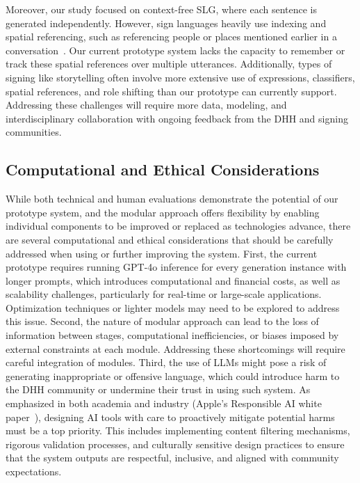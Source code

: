 Moreover, our study focused on context-free SLG, where each sentence is generated independently. However, sign languages heavily use indexing and spatial referencing, such as referencing people or places mentioned earlier in a conversation~\cite{winston1991spatial,friedman1975space}. Our current prototype system lacks the capacity to remember or track these spatial references over multiple utterances. Additionally, types of signing like storytelling often involve more extensive use of expressions, classifiers, spatial references, and role shifting than our prototype can currently support. Addressing these challenges will require more data, modeling, and interdisciplinary collaboration with ongoing feedback from the DHH and signing communities. 

\subsection{Computational and Ethical Considerations}

While both technical and human evaluations demonstrate the potential of our prototype system, and the modular approach offers flexibility by enabling individual components to be improved or replaced as technologies advance, there are several computational and ethical considerations that should be carefully addressed when using or further improving the system. First, the current prototype requires running GPT-4o inference for every generation instance with longer prompts, which introduces computational and financial costs, as well as scalability challenges, particularly for real-time or large-scale applications. Optimization techniques or lighter models may need to be explored to address this issue. Second, the nature of modular approach can lead to the loss of information between stages, computational inefficiencies, or biases imposed by external constraints at each module. Addressing these shortcomings will require careful integration of modules. Third, the use of LLMs might pose a risk of generating inappropriate or offensive language, which could introduce harm to the DHH community or undermine their trust in using such system. As emphasized in both academia and industry (\eg Apple's Responsible AI white paper~\cite{applewhitepaper}), designing AI tools with care to proactively mitigate potential harms must be a top priority. This includes implementing content filtering mechanisms, rigorous validation processes, and culturally sensitive design practices to ensure that the system outputs are respectful, inclusive, and aligned with community expectations.




